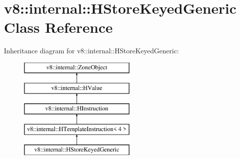 \hypertarget{classv8_1_1internal_1_1_h_store_keyed_generic}{}\section{v8\+:\+:internal\+:\+:H\+Store\+Keyed\+Generic Class Reference}
\label{classv8_1_1internal_1_1_h_store_keyed_generic}
Inheritance diagram for v8\+:\+:internal\+:\+:H\+Store\+Keyed\+Generic\+:\begin{figure}[H]
\begin{center}
\leavevmode
\includegraphics[height=5.000000cm]{classv8_1_1internal_1_1_h_store_keyed_generic}
\end{center}
\end{figure}
